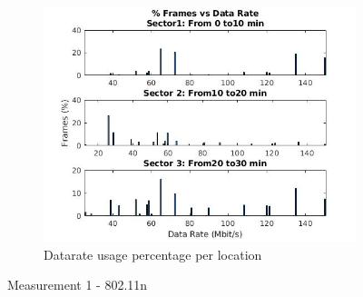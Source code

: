 \documentclass[12]{article}
\begin{document}
\begin{figure}[!htb]
\begin{subfigure}{.5\textwidth}
  \label{fig:n_meas1_sub2}
\end{subfigure}%
\hspace*{-1.2cm}
\begin{subfigure}{.5\textwidth}
  \includegraphics[width=\linewidth]{"measurement 1/n_test3"}
  \caption{Datarate usage percentage per location}
  \label{fig:n_meas1_sub3}
\end{subfigure}
\caption{Measurement 1 - 802.11n}
\label{fig:n_meas1}
\end{figure}
\end{document}
